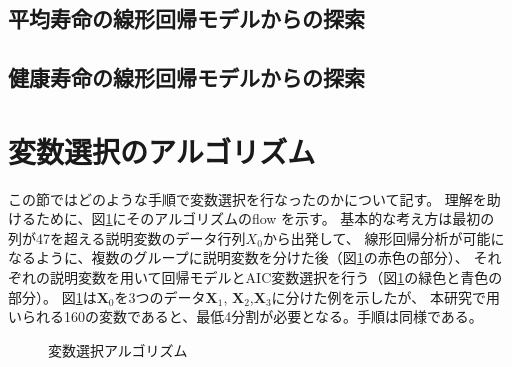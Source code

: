 \documentclass[a4j,11pt,mc]{jreport}
\begin{document}
\subsection{平均寿命の線形回帰モデルからの探索}



\subsection{健康寿命の線形回帰モデルからの探索}






\section{変数選択のアルゴリズム}


この節ではどのような手順で変数選択を行なったのかについて記す。
理解を助けるために、図\ref{Varsel}にそのアルゴリズムのflow を示す。
基本的な考え方は最初の
列が47を超える説明変数のデータ行列$X_0$から出発して、
線形回帰分析が可能になるように、複数のグループに説明変数を分けた後（図\ref{Varsel}の赤色の部分）、
それぞれの説明変数を用いて回帰モデルとAIC変数選択を行う（図\ref{Varsel}の緑色と青色の部分）。
図\ref{Varsel}は$\bm{X}_0$を3つのデータ$\bm{X}_1$, $\bm{X}_2$,$\bm{X}_3$に分けた例を示したが、
本研究で用いられる160の変数であると、最低4分割が必要となる。手順は同様である。



 \begin{figure}
\centering
	\caption{変数選択アルゴリズム}
	\label{Varsel}
 \end{figure}





%
%
%
%
%
%
%
\end{document}
